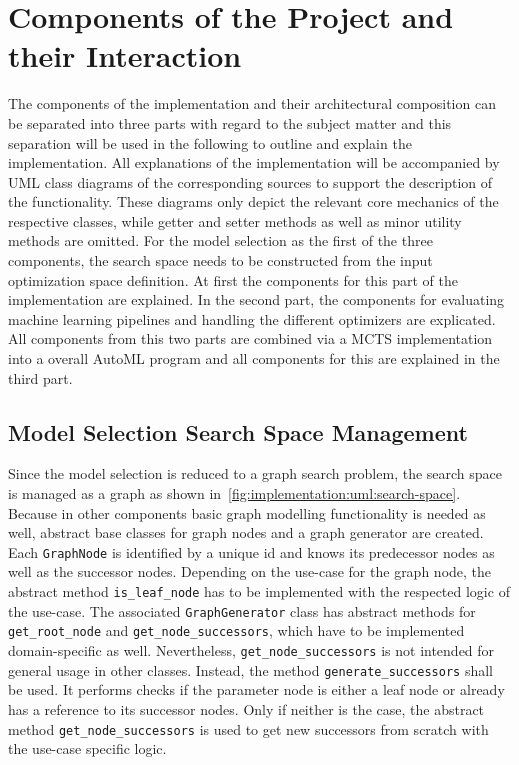\section{Components of the Project and their Interaction}
\label{sec:implementation:components}
The components of the implementation and their architectural composition can be separated into three parts with regard to the subject matter and this separation will be used in the following to outline and explain the implementation.
All explanations of the implementation will be accompanied by UML class diagrams of the corresponding sources to support the description of the functionality.
These diagrams only depict the relevant core mechanics of the respective classes, while getter and setter methods as well as minor utility methods are omitted.\newline 
For the model selection as the first of the three components, the search space needs to be constructed from the input optimization space definition.
At first the components for this part of the implementation are explained.
In the second part, the components for evaluating machine learning pipelines and handling the different optimizers are explicated.
All components from this two parts are combined via a MCTS implementation into a overall AutoML program and all components for this are explained in the third part.

\subsection{Model Selection Search Space Management}
\label{sec:implementation:components:search-space}
Since the model selection is reduced to a graph search problem, the search space is managed as a graph as shown in~\ref{fig:implementation:uml:search-space}.
Because in other components basic graph modelling functionality is needed as well, abstract base classes for graph nodes and a graph generator are created.
Each \texttt{GraphNode} is identified by a unique id and knows its predecessor nodes as well as the successor nodes.
Depending on the use-case for the graph node, the abstract method \texttt{is\_leaf\_node} has to be implemented with the respected logic of the use-case.\newline
The associated \texttt{GraphGenerator} class has abstract methods for \texttt{get\_root\_node} and \texttt{get\_node\_successors}, which have to be implemented domain-specific as well.
Nevertheless, \texttt{get\_node\_successors} is not intended for general usage in other classes.
Instead, the method \texttt{generate\_successors} shall be used.
It performs checks if the parameter node is either a leaf node or already has a reference to its successor nodes.
Only if neither is the case, the abstract method \texttt{get\_node\_successors} is used to get new successors from scratch with the use-case specific logic.

